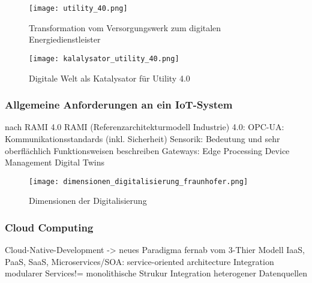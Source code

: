 \begin{figure}[ht]
  \texttt{[image: utility\_40.png]}
  \caption[Transformation vom Versorgungswerk zum digitalen Energiedienstleister]{Transformation vom Versorgungswerk zum digitalen Energiedienstleister \citep[S. 13]{Doleski2016}}
\end{figure}

\begin{figure}[ht]
  \texttt{[image: kalalysator\_utility\_40.png]}
  \caption[Digitale Welt als Katalysator für Utility 4.0 ]{Digitale Welt als Katalysator für Utility 4.0 \citep[S. 17]{Doleski2016}}
\end{figure}

\subsubsection{Allgemeine Anforderungen an ein IoT-System}
nach RAMI 4.0
RAMI (Referenzarchitekturmodell Industrie) 4.0: OPC-UA: Kommunikationsstandards (inkl. Sicherheit)
Sensorik: Bedeutung und sehr oberflächlich Funktionsweisen beschreiben
Gateways: Edge Processing
Device Management
Digital Twins

\begin{figure}[h]
  \texttt{[image: dimensionen\_digitalisierung\_fraunhofer.png]}
  \caption[Dimensionen der Digitalisierung]{Dimensionen der Digitalisierung \citep{FraunhoferISE}}
\end{figure}


\subsubsection{Cloud Computing}
Cloud-Native-Development -> neues Paradigma fernab vom 3-Thier Modell
IaaS, PaaS, SaaS, Microservices/SOA: service-oriented architecture
Integration modularer Services!= monolithische Strukur
Integration heterogener Datenquellen
